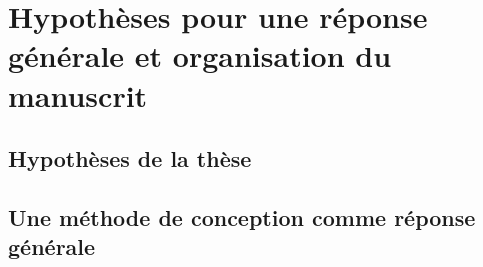 \documentclass[ twoside,openright,titlepage,numbers=noenddot,headinclude,%
                footinclude=true,cleardoublepage=empty,abstractoff, %
                BCOR=5mm,paper=a4,fontsize=11pt,%
                french,american,%
                ]{scrreprt}
\begin{document}
\chapter{Hypothèses pour une réponse générale et organisation du manuscrit}

\section{Hypothèses de la thèse}

\section{Une méthode de conception comme réponse générale}
\end{document}
